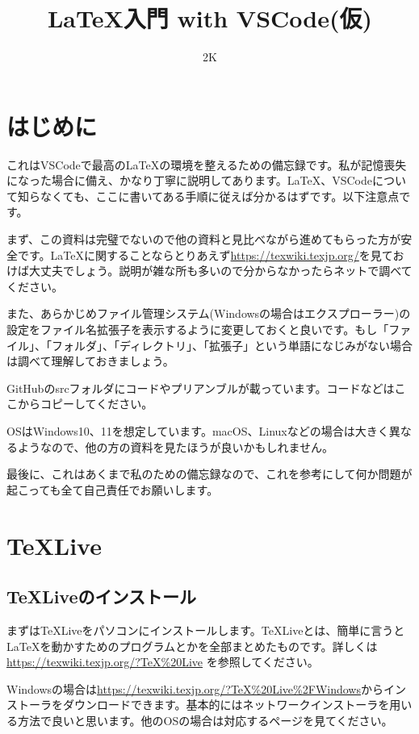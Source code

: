 

\title{\LaTeX 入門 with VSCode(仮)}
\author{2K}


\maketitle

\section{はじめに}
これはVSCodeで最高の\LaTeX の環境を整えるための備忘録です。私が記憶喪失になった場合に備え、かなり丁寧に説明してあります。LaTeX、VSCodeについて知らなくても、ここに書いてある手順に従えば分かるはずです。以下注意点です。

まず、この資料は完璧でないので他の資料と見比べながら進めてもらった方が安全です。\LaTeX に関することならとりあえず\url{https://texwiki.texjp.org/}を見ておけば大丈夫でしょう。説明が雑な所も多いので分からなかったらネットで調べてください。

また、あらかじめファイル管理システム(Windowsの場合はエクスプローラー)の設定をファイル名拡張子を表示するように変更しておくと良いです。もし「ファイル」、「フォルダ」、「ディレクトリ」、「拡張子」という単語になじみがない場合は調べて理解しておきましょう。

GitHubのsrcフォルダにコードやプリアンブルが載っています。コードなどはここからコピーしてください。

OSはWindows10、11を想定しています。macOS、Linuxなどの場合は大きく異なるようなので、他の方の資料を見たほうが良いかもしれません。

最後に、これはあくまで私のための備忘録なので、これを参考にして何か問題が起こっても全て自己責任でお願いします。

\section{\TeX Live}
\subsection{\TeX Liveのインストール}
まずは\TeX Liveをパソコンにインストールします。\TeX Liveとは、簡単に言うと\LaTeX を動かすためのプログラムとかを全部まとめたものです。詳しくは \url{https://texwiki.texjp.org/?TeX%20Live} を参照してください。

Windowsの場合は\url{https://texwiki.texjp.org/?TeX%20Live%2FWindows}からインストーラをダウンロードできます。基本的にはネットワークインストーラを用いる方法で良いと思います。他のOSの場合は対応するページを見てください。


